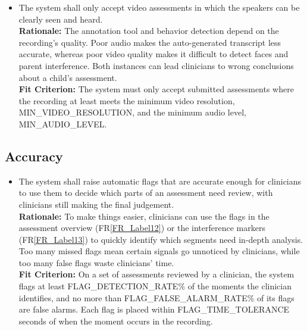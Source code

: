 \documentclass[12pt]{article}
\newcommand{\rref}[1]{FR\ref{#1}}
\newcounter{nfrnum} %
\newcommand{\rthenfrnum}{NFR\thenfrnum}
\begin{document}
\noindent \begin{itemize}

\item[\textbf{\rthenfrnum}:]
\label{NFR-P1}
  The system shall only accept video assessments in which the speakers can be clearly seen and heard.
  \\ \textbf{Rationale:} The annotation tool and behavior detection depend on the recording’s quality. Poor audio makes the auto-generated transcript less accurate, whereas poor video quality makes it difficult to detect faces and parent interference. Both instances can lead clinicians to wrong conclusions about a child’s assessment.
  \\ \textbf{Fit Criterion:} The system must only accept submitted assessments where the recording at least meets the minimum video resolution, MIN\_VIDEO\_RESOLUTION, and the minimum audio level, MIN\_AUDIO\_LEVEL.

\end{itemize}

\subsection{Accuracy}

\noindent \begin{itemize}

\item[\textbf{\rthenfrnum}:]
\label{NFR-A1}
  The system shall raise automatic flags that are accurate enough for clinicians to use them to decide which parts of an assessment need review, with clinicians still making the final judgement.
  \\ \textbf{Rationale:} To make things easier, clinicians can use the flags in the assessment overview (\rref{FR_Label12}) or the interference markers (\rref{FR_Label13}) to quickly identify which segments need in-depth analysis. Too many missed flags mean certain signals go unnoticed by clinicians, while too many false flags waste clinicians' time.
  \\ \textbf{Fit Criterion:} On a set of assessments reviewed by a clinician, the system flags at least FLAG\_DETECTION\_RATE\% of the moments the clinician identifies, and no more than FLAG\_FALSE\_ALARM\_RATE\% of its flags are false alarms. Each flag is placed within FLAG\_TIME\_TOLERANCE seconds of when the moment occurs in the recording.

\end{itemize}
\end{document}
